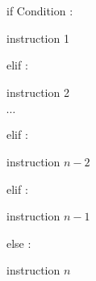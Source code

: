\begin{Rq}

\color{orange} if \color{black}  Condition :

\hspace{0.4cm}    instruction 1
    
\color{orange} elif \color{black} :

\hspace{0.4cm}     instruction 2

$\cdots$

\color{orange} elif \color{black} :

\hspace{0.4cm}     instruction $n-2$

\color{orange} elif \color{black} :

\hspace{0.4cm}     instruction $n-1$

\color{orange} else \color{black} :

\hspace{0.4cm}     instruction $n$

\end{Rq}
